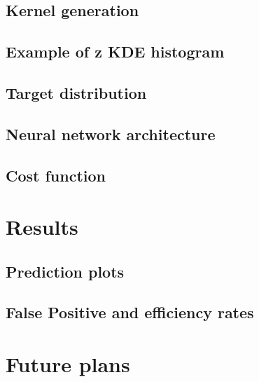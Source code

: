 \documentclass[aspectratio=169, 10pt]{beamer}
\begin{document}
\subsection{Kernel generation}


\subsection{Example of z KDE histogram}


\subsection{Target distribution}


\subsection{Neural network architecture}


\subsection{Cost function}



\section{Results}

\subsection{Prediction plots}


\subsection{False Positive and efficiency rates}



\section{Future plans}
\end{document}
